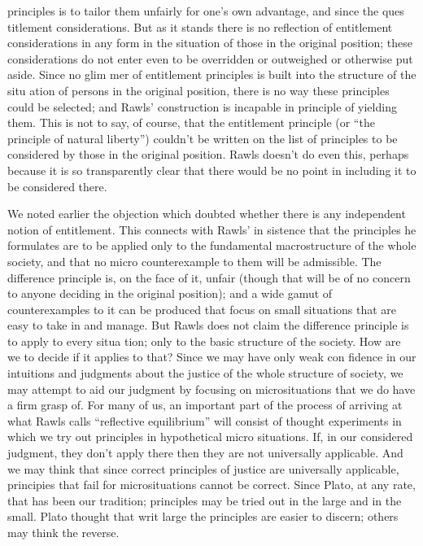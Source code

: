 \documentclass[11pt,openany]{book}
\begin{document}
principles is to tailor them unfairly for one's own advantage, and since the ques titlement considerations. But as it stands there is no reflection of entitlement considerations in any form in the situation of those in the original position; these considerations do not enter even to be overridden or outweighed or otherwise put aside. Since no glim mer of entitlement principles is built into the structure of the situ ation of persons in the original position, there is no way these principles could be selected; and Rawls' construction is incapable in principle of yielding them. This is not to say, of course, that the entitlement principle (or ``the principle of natural liberty'') couldn't be written on the list of principles to be considered by those in the original position. Rawls doesn't do even this, perhaps because it is so transparently clear that there would be no point in including it to be considered there. 

We noted earlier the objection which doubted whether there is any independent notion of entitlement. This connects with Rawls' in sistence that the principles he formulates are to be applied only to the fundamental macrostructure of the whole society, and that no micro counterexample to them will be admissible. The difference principle is, on the face of it, unfair (though that will be of no concern to anyone deciding in the original position); and a wide gamut of counterexamples to it can be produced that focus on small situations that are easy to take in and manage. But Rawls does not claim the difference principle is to apply to every situa tion; only to the basic structure of the society. How are we to decide if it applies to that? Since we may have only weak con fidence in our intuitions and judgments about the justice of the whole structure of society, we may attempt to aid our judgment by focusing on microsituations that we do have a firm grasp of. For many of us, an important part of the process of arriving at what Rawls calls ``reflective equilibrium'' will consist of thought experiments in which we try out principles in hypothetical micro situations. If, in our considered judgment, they don't apply there then they are not universally applicable. And we may think that since correct principles of justice are universally applicable, principies that fail for microsituations cannot be correct. Since Plato, at any rate, that has been our tradition; principles may be tried out in the large and in the small. Plato thought that writ large the principles are easier to discern; others may think the reverse. 
\end{document}
